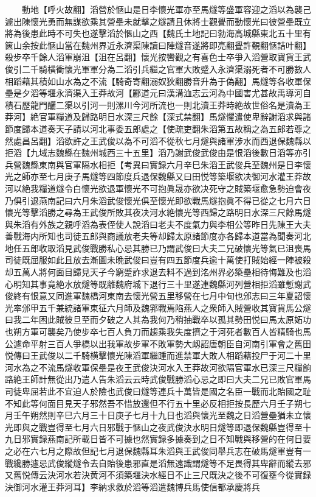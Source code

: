 　　動地【呼火故翻】滔營於愜山是日李懷光軍亦至馬燧等盛軍容迎之滔以為襲己遽出陳懷光勇而無謀欲乘其營壘未就擊之燧請且休將士觀舋而動懷光曰彼營壘既立將為後患此時不可失也遂擊滔於愜山之西【魏氏土地記曰勃海高城縣東北五十里有篋山余按此愜山當在魏州界近永濟渠陳讀曰陣燧音遂將即亮翻舋許覲翻愜詰叶翻】殺步卒千餘人滔軍崩沮【沮在呂翻】懷光按轡觀之有喜色士卒爭入滔營取寶貨王武俊引二千騎横衝懷光軍軍分為二滔引兵繼之官軍大敗蹙入永濟渠溺死者不可勝數人相蹈藉其積如山水為之不流【騎奇寄翻溺奴狄翻勝音升為于偽翻】馬燧等各收軍保壘是夕滔等堰永濟渠入王莽故河【酈道元曰漢溝洫志云河為中國害尤甚故禹導河自積石歷龍門釃二渠以引河一則漯川今河所流也一則北瀆王莽時絶故世俗名是瀆為王莽河】絶官軍糧道及歸路明日水深三尺餘【深式禁翻】馬燧懼遣使卑辭謝滔求與諸節度歸本道奏天子請以河北事委五郎處之【使疏吏翻朱滔第五故稱之為五郎若尊之然處昌呂翻】滔欲許之王武俊以為不可滔不從秋七月燧與諸軍涉水而西退保魏縣以拒滔【九域志魏縣在魏州城西三十五里】滔乃謝武俊武俊由是恨滔後數日滔等亦引兵營魏縣東南與官軍隔水相拒【考異曰實録六月辛巳朱滔王武俊兵至魏州是日李懷光之師亦至七月庚子馬燧等四節度兵退保魏縣又曰田悦等築堰欲决御河水灌王莽故河以絶我糧道燧令白懷光欲退軍懷光不可抱眞晟亦欲决死守之賊築堰愈急勢迫會夜乃俱引退燕南記曰六月朱滔武俊懷光俱至懷光即欲戰馬燧抱眞不得已從之七月六日懷光等擊滔勝之尋為王武俊所敗其夜决河水絶懷光等西歸之路明日水深三尺餘馬燧與朱滔有外族之親呼滔為表侄使人說滔曰老夫不度氣力與李相公等昨日先陳王大夫善戰海内所知也司徒五郎與商議放老夫等却歸太原諸節度亦各歸本道當為聞奏河北地任五郎收取滔見武俊戰勝私心忌其勝已乃謂武俊曰大夫二兄破懷光等氣已沮喪馬司徒既屈服如此且放去漸圖未晩武俊曰豈有四五節度兵逾十萬使打賊始經一陣被殺却五萬人將何面目歸見天子今窮蹙詐求退去料不過到洺州界必築壘相待悔難及也滔心明知其事竟絶水放燧等既離魏府城下退行三十里遂連魏縣河列營相拒滔雖慙謝武俊終有恨意又同進軍魏橋河東南去懷光營五里移營在七月中旬也邠志曰三年夏詔懷光率邠甲五千兼統諸軍東征六月師及魏郛戰焉陷燕人之衆師入賊營收其寶貨馬公燧曰我二年困此賊彼旦至而夕破之人其為我何乃稍抽戰卒以孤其勢田悦曰馬太原妬功也朔方軍可襲矣乃使步卒七百人負刀而趨乘我失度擠之于河死者數百人皆精騎也馬公遽命平射三百人爭橋以出我軍故步軍不敗軍勢大衂詔唐朝臣自河南引軍會之舊田悦傳曰王武俊以二千騎横擊懷光陳滔軍繼踵而進禁軍大敗人相蹈藉投尸于河二十里河水為之不流馬燧收軍保壘是夜王武俊決河水入王莽故河欲隔官軍水已深三尺糧餉路絶王師計無從出乃遣人告朱滔云云時武俊戰勝滔心忌之即曰大夫二兄已敗官軍馬司徒卑屈若此不宜迫人於險也武俊曰燧等連兵十萬皆是國之名臣一戰而北貽國之耻不知此等何面目見天子邪然吾不惜放還但不行五十里必反相拒按長歷六月壬子朔七月壬午朔然則辛巳六月三十日庚子七月十九日也滔與懷光至魏之日滔營壘猶未立懷光即與之戰豈得至七月六日邪戰于愜山之夜武俊決水明日燧等即退保魏縣豈得至十九日邪實録燕南記所載日皆不可據也然實録多據奏到之日不知戰與移營的在何日要之必在六七月之際故但記七月退保魏縣耳朱滔與王武俊同舉兵志在破馬燧軍豈有一戰纔勝遽忌武俊縱燧令去自貽後患邪直是滔無遠識謂燧等不足畏得其卑辭而縱去邪又舊悦傳云決河水若決黄河不須築堰決水經日不止三尺既決之後不可復壅今從實録決御河水灌王莽河耳】李納求救於滔等滔遣魏博兵馬使信都承慶將兵

